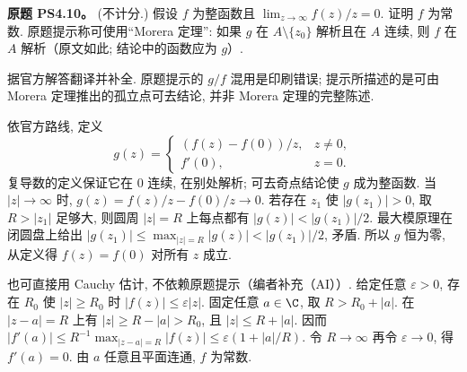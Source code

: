 \begin{exercise}\label{ass:ps4-10}
\textbf{原题 PS4.10。} (不计分.) 假设 $f$ 为整函数且
$\lim_{z\to\infty}f(z)/z=0$. 证明 $f$ 为常数.
原题提示称可使用“Morera 定理”: 如果 $g$ 在 $A\setminus\{z_0\}$ 解析且在 $A$ 连续, 则 $f$ 在 $A$ 解析（原文如此; 结论中的函数应为 $g$）.
\end{exercise}
\begin{solution}
据官方解答翻译并补全. 原题提示的 $g/f$ 混用是印刷错误; 提示所描述的是可由 Morera 定理推出的孤立点可去结论, 并非 Morera 定理的完整陈述.

依官方路线, 定义
\[
 g(z)=
 \begin{cases}
 (f(z)-f(0))/z,&z\ne0,\\
 f'(0),&z=0.
 \end{cases}
\]
复导数的定义保证它在 $0$ 连续, 在别处解析; 可去奇点结论使 $g$ 成为整函数.
当 $|z|\to\infty$ 时, $g(z)=f(z)/z-f(0)/z\to0$.
若存在 $z_1$ 使 $|g(z_1)|>0$, 取 $R>|z_1|$ 足够大, 则圆周 $|z|=R$ 上每点都有
$|g(z)|<|g(z_1)|/2$. 最大模原理在闭圆盘上给出
$|g(z_1)|\le\max_{|z|=R}|g(z)|<|g(z_1)|/2$, 矛盾.
所以 $g$ 恒为零, 从定义得 $f(z)=f(0)$ 对所有 $z$ 成立.

也可直接用 Cauchy 估计, 不依赖原题提示（编者补充（AI））.
给定任意 $\varepsilon>0$, 存在 $R_0$ 使 $|z|\ge R_0$ 时 $|f(z)|\le\varepsilon|z|$.
固定任意 $a\in\C$, 取 $R>R_0+|a|$. 在 $|z-a|=R$ 上有
$|z|\ge R-|a|>R_0$, 且 $|z|\le R+|a|$. 因而
$|f'(a)|\le R^{-1}\max_{|z-a|=R}|f(z)|
\le\varepsilon(1+|a|/R)$.
令 $R\to\infty$ 再令 $\varepsilon\to0$, 得 $f'(a)=0$. 由 $a$ 任意且平面连通, $f$ 为常数.
\end{solution}

